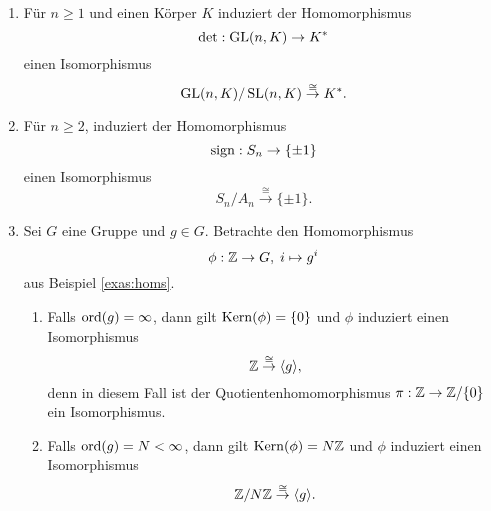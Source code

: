 \documentclass{book}
\begin{document}
\begin{exas}
    \label{exas:homsatz}
    \begin{enumerate}
        \item Für $n \ge 1$ und einen Körper $K$ induziert der Homomorphismus 
            \[
                \det: \operatorname{GL}(n,K) \to K^*
            \]
            einen Isomorphismus
            \[
                \operatorname{GL}(n,K)/\operatorname{SL}(n,K) \overset{\cong}{\to} K^*.
            \]
        \item Für $n \ge 2$, induziert der Homomorphismus
            \[
                \operatorname{sign}: S_n \to \{\pm 1\}
            \]
            einen Isomorphismus
            \[
                S_n/A_n \overset{\cong}{\to} \{ \pm 1\}.
            \]
        \item Sei $G$ eine Gruppe und $g \in G$. Betrachte den Homomorphismus
            \[
                \phi: \ZZ \to G,\; i \mapsto g^i
            \]
            aus Beispiel \ref{exas:homs}.
            \begin{enumerate}
                \item Falls $\operatorname{ord}(g) = \infty$, dann gilt $\Kern(\phi) = \{0\}$ und $\phi$ induziert einen Isomorphismus
                    \[
                        \mathbb{Z} \overset{\cong}{\to} \langle g \rangle ,
                    \]
                    denn in diesem Fall ist der Quotientenhomomorphismus $\pi: \mathbb{Z} \to \mathbb{Z}/ \{0\}$ ein Isomorphismus.
                \item Falls $\operatorname{ord}(g) = N < \infty$, dann gilt $\Kern(\phi) = N \ZZ$ und $\phi$ induziert einen Isomorphismus
                    \[
                        \mathbb{Z}/N\mathbb{Z} \overset{\cong}{\to} \langle g \rangle .
                    \]
            \end{enumerate}
    \end{enumerate}
\end{exas}

\end{document}
